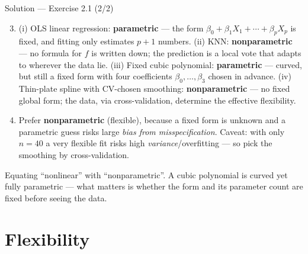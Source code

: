 \documentclass[aspectratio=169,11pt]{beamer}
\begin{document}
\begin{frame}{Solution --- Exercise 2.1 (2/2)}
\begin{solutionbox}
\begin{enumerate}\setcounter{enumi}{2}
  \item (i) OLS linear regression: \textbf{parametric} --- the form
        $\beta_0+\beta_1X_1+\cdots+\beta_pX_p$ is fixed, and fitting
        only estimates $p+1$ numbers.
        (ii) KNN: \textbf{nonparametric} --- no formula for $f$ is
        written down; the prediction is a local vote that adapts to
        wherever the data lie.
        (iii) Fixed cubic polynomial: \textbf{parametric} --- curved,
        but still a fixed form with four coefficients
        $\beta_0,\ldots,\beta_3$ chosen in advance.
        (iv) Thin-plate spline with CV-chosen smoothing:
        \textbf{nonparametric} --- no fixed global form; the data,
        via cross-validation, determine the effective flexibility.
  \item Prefer \textbf{nonparametric} (flexible), because a fixed form
        is unknown and a parametric guess risks large
        \emph{bias from misspecification}. Caveat: with only $n=40$ a
        very flexible fit risks high \emph{variance}/overfitting --- so
        pick the smoothing by cross-validation.
\end{enumerate}
\end{solutionbox}
\begin{mistake}
Equating ``nonlinear'' with
``nonparametric''. A cubic polynomial is curved yet fully parametric
--- what matters is whether the form and its parameter count are fixed
before seeing the data.
\end{mistake}
\end{frame}


\section{Flexibility}
\end{document}
